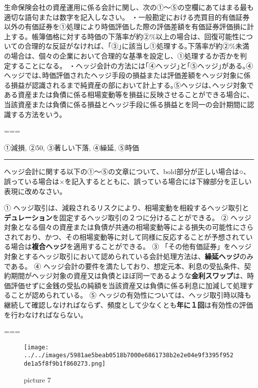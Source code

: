 \documentclass[report,gutter=10mm,fore-edge=10mm,uplatex,dvipdfmx]{jlreq}
\begin{document}
生命保険会社の資産運用に係る会計に関し、次の①～⑤の空欄にあてはまる最も適切な語句または数字を記入しなさい。
・一般勘定における売買目的有価証券以外の有価証券を①処理により時価評価した際の評価差額を有価証券評価損に計上する。帳簿価格に対する時価の下落率が約②\%以上の場合は、回復可能性についての合理的な反証がなければ、｢③｣に該当し①処理する｡下落率が約②\%未満の場合は、個々の企業において合理的な基準を設定し、①処理するか否かを判
定することになる。
・ヘッジ会計の方法には｢④ヘッジ｣と｢⑤ヘッジ｣がある｡④ヘッジでは､時価評価されたヘッジ手段の損益または評価差額をヘッジ対象に係る損益が認識されるまで純資産の部において計上する｡⑤ヘッジは､ヘッジ対象である資産または負債に係る相場変動等を損益に反映させることができる場合に、当該資産または負債に係る損益とヘッジ手段に係る損益とを同一の会計期間に認識する方法をいう。

===


①減損, ②50, ③著しい下落, ④繰延, ⑤時価

\begin{center}\rule{0.5\linewidth}{0.5pt}\end{center}


ヘッジ会計に関する以下の①～⑤の文章について、bold部分が正しい場合は○、誤っている場合は×を記入するとともに、誤っている場合には下線部分を正しい表現に改めなさい。

①
ヘッジ取引は、減殺されるリスクにより、相場変動を相殺するヘッジ取引と\textbf{デュレーション}を固定するヘッジ取引の２つに分けることができる。
②
ヘッジ対象となる個々の資産または負債が共通の相場変動等による損失の可能性にさらされており、かつ、その相場変動等に対して同様に反応することが予想されている場合は\textbf{複合ヘッジ}を適用することができる。
③
「その他有価証券」をヘッジ対象とするヘッジ取引において認められている会計処理方法は、\textbf{繰延ヘッジ}のみである。
④
ヘッジ会計の要件を満たしており、想定元本、利息の受払条件、契約期間がヘッジ対象の資産又は負債とほぼ同一であるような\textbf{金利スワップ}は、時価評価せずに金銭の受払の純額を当該資産又は負債に係る利息に加減して処理することが認められている。
⑤
ヘッジの有効性については、ヘッジ取引時以降も継続して確認しなければならず、頻度として少なくとも\textbf{年に１回}は有効性の評価を行わなければならない。

===


\begin{figure}
\centering
\texttt{[image: ../../images/5981ae5beab0518b7000e6861738b2e2e04e9f3395f952de1a5f8f9b1f860273.png]}
\caption{picture 7}
\end{figure}
\end{document}
